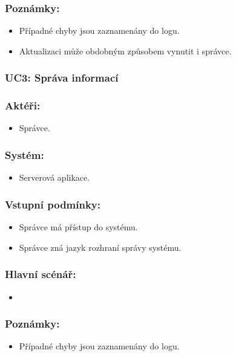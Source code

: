 \subsubsection*{Poznámky:}
\begin{itemize}
 \item Případné chyby jsou zaznamenány do logu.
 \item Aktualizaci může obdobným způsobem vynutit i správce.
\end{itemize}

\subsubsection{UC3: Správa informací}
\subsubsection*{Aktéři:}
\begin{itemize}
 \item Správce.
\end{itemize}
\subsubsection*{Systém:}
\begin{itemize}
 \item Serverová aplikace.
\end{itemize}
\subsubsection*{Vstupní podmínky:}
\begin{itemize}
 \item Správce má přístup do systému.
 \item Správce zná jazyk rozhraní správy systému.
\end{itemize}
\subsubsection*{Hlavní scénář:}
\begin{itemize}
 \item 
\end{itemize}
\subsubsection*{Poznámky:}
\begin{itemize}
 \item Případné chyby jsou zaznamenány do logu.
\end{itemize}



